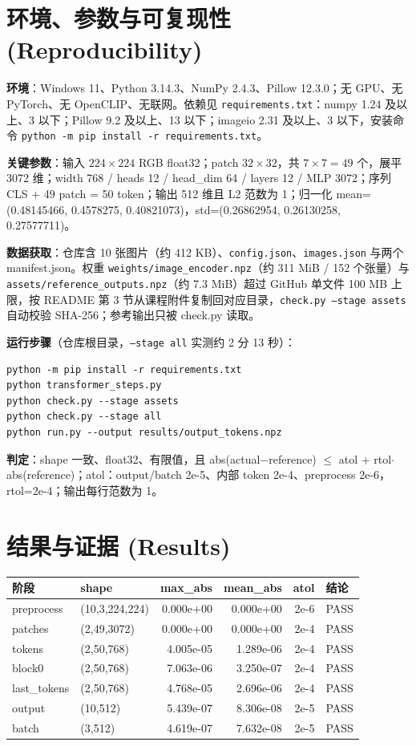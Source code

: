 \documentclass[a4paper,12pt]{article}
\begin{document}
\section{环境、参数与可复现性 (Reproducibility)}

\textbf{环境}：Windows 11、Python 3.14.3、NumPy 2.4.3、Pillow 12.3.0；无 GPU、无 PyTorch、无 OpenCLIP、无联网。依赖见 \texttt{requirements.txt}：numpy 1.24 及以上、3 以下；Pillow 9.2 及以上、13 以下；imageio 2.31 及以上、3 以下，安装命令 \texttt{python -m pip install -r requirements.txt}。

\textbf{关键参数}：输入 $224\times224$ RGB float32；patch $32\times32$，共 $7\times7=49$ 个，展平 3072 维；width 768 / heads 12 / head\_dim 64 / layers 12 / MLP 3072；序列 CLS + 49 patch = 50 token；输出 512 维且 L2 范数为 1；归一化 mean=(0.48145466, 0.4578275, 0.40821073)，std=(0.26862954, 0.26130258, 0.27577711)。

\textbf{数据获取}：仓库含 10 张图片（约 412 KB）、\texttt{config.json}、\texttt{images.json} 与两个 manifest.json。权重 \texttt{weights/image\_encoder.npz}（约 311 MiB / 152 个张量）与 \texttt{assets/reference\_outputs.npz}（约 7.3 MiB）超过 GitHub 单文件 100 MB 上限，按 README 第 3 节从课程附件复制回对应目录，\texttt{check.py --stage assets} 自动校验 SHA-256；参考输出只被 check.py 读取。

\textbf{运行步骤}（仓库根目录，\texttt{--stage all} 实测约 2 分 13 秒）：
\begin{verbatim}
python -m pip install -r requirements.txt
python transformer_steps.py
python check.py --stage assets
python check.py --stage all
python run.py --output results/output_tokens.npz
\end{verbatim}
\textbf{判定}：shape 一致、float32、有限值，且 abs(actual$-$reference) $\le$ atol + rtol$\cdot$abs(reference)；atol：output/batch 2e-5、内部 token 2e-4、preprocess 2e-6，rtol=2e-4；输出每行范数为 1。

\section{结果与证据 (Results)}

\begin{table}[H]
\centering\small
\begin{tabular}{|l|l|r|r|r|l|}
\hline
阶段 & shape & max\_abs & mean\_abs & atol & 结论 \\
\hline
preprocess & (10,3,224,224) & 0.000e+00 & 0.000e+00 & 2e-6 & PASS \\
patches & (2,49,3072) & 0.000e+00 & 0.000e+00 & 2e-4 & PASS \\
tokens & (2,50,768) & 4.005e-05 & 1.289e-06 & 2e-4 & PASS \\
block0 & (2,50,768) & 7.063e-06 & 3.250e-07 & 2e-4 & PASS \\
last\_tokens & (2,50,768) & 4.768e-05 & 2.696e-06 & 2e-4 & PASS \\
output & (10,512) & 5.439e-07 & 8.306e-08 & 2e-5 & PASS \\
batch & (3,512) & 4.619e-07 & 7.632e-08 & 2e-5 & PASS \\
\hline
\end{tabular}
\end{table}
\end{document}
